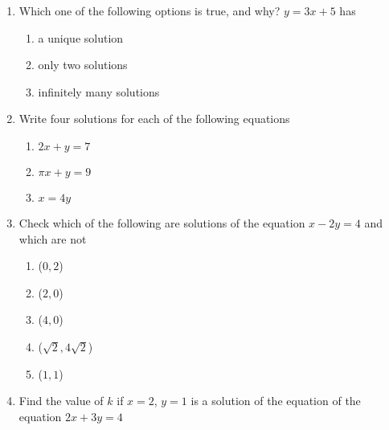 \begin{enumerate}
\item Which one of the following options is true, and why?
 $y=3x+5$ has
\begin{enumerate}[label=(\roman*)]
\item a unique solution
\item only two solutions
\item infinitely many solutions
\end{enumerate}
\item Write four solutions for each of the following equations
\begin{enumerate}[label=(\roman*)]
\item $2x+y=7$
\item $\pi x+y=9$
\item $x=4y$
\end{enumerate}
\item Check which of the following are solutions of the equation $x-2y=4$ and which 
are not
\begin{enumerate}[label=(\roman*)]
\item ($0,2$)
\item ($2,0$)
\item ($4,0$)
\item ($\sqrt 2, 4\sqrt 2$)
\item ($1,1$)
\end{enumerate}
\item Find the value of $k$ if $x=2$, $y=1$ is a solution of the equation of the equation $2x+3y=4$
\end{enumerate}
